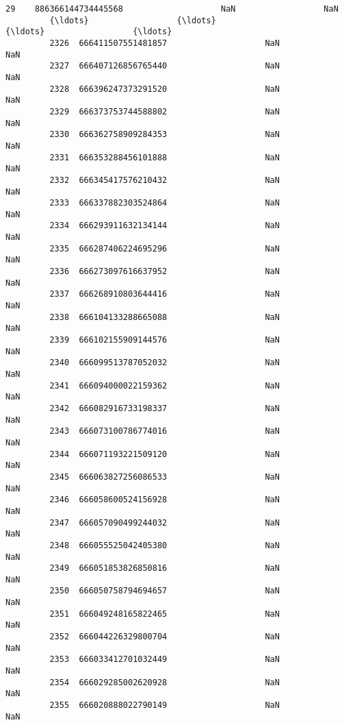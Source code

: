 \documentclass[11pt]{article}
\begin{document}
\begin{Verbatim}[commandchars=\\\{\}]
         29    886366144734445568                    NaN                  NaN   
         {\ldots}                  {\ldots}                    {\ldots}                  {\ldots}   
         2326  666411507551481857                    NaN                  NaN   
         2327  666407126856765440                    NaN                  NaN   
         2328  666396247373291520                    NaN                  NaN   
         2329  666373753744588802                    NaN                  NaN   
         2330  666362758909284353                    NaN                  NaN   
         2331  666353288456101888                    NaN                  NaN   
         2332  666345417576210432                    NaN                  NaN   
         2333  666337882303524864                    NaN                  NaN   
         2334  666293911632134144                    NaN                  NaN   
         2335  666287406224695296                    NaN                  NaN   
         2336  666273097616637952                    NaN                  NaN   
         2337  666268910803644416                    NaN                  NaN   
         2338  666104133288665088                    NaN                  NaN   
         2339  666102155909144576                    NaN                  NaN   
         2340  666099513787052032                    NaN                  NaN   
         2341  666094000022159362                    NaN                  NaN   
         2342  666082916733198337                    NaN                  NaN   
         2343  666073100786774016                    NaN                  NaN   
         2344  666071193221509120                    NaN                  NaN   
         2345  666063827256086533                    NaN                  NaN   
         2346  666058600524156928                    NaN                  NaN   
         2347  666057090499244032                    NaN                  NaN   
         2348  666055525042405380                    NaN                  NaN   
         2349  666051853826850816                    NaN                  NaN   
         2350  666050758794694657                    NaN                  NaN   
         2351  666049248165822465                    NaN                  NaN   
         2352  666044226329800704                    NaN                  NaN   
         2353  666033412701032449                    NaN                  NaN   
         2354  666029285002620928                    NaN                  NaN   
         2355  666020888022790149                    NaN                  NaN   
         

\end{Verbatim}
\end{document}
